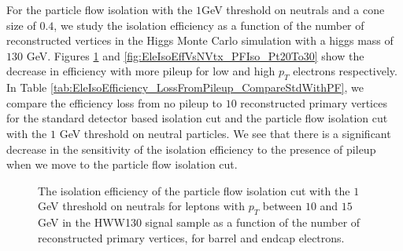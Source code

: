 For the particle flow isolation with the $1$GeV threshold on neutrals and a cone size of $0.4$, we study the isolation
efficiency as a function of the number of reconstructed vertices in the Higgs Monte Carlo simulation with a higgs 
mass of $130$ GeV. Figures \ref{fig:EleIsoEffVsNVtx_PFIso_Pt10To15} and \ref{fig:EleIsoEffVsNVtx_PFIso_Pt20To30}
show the decrease in efficiency with more pileup for low and high $p_{T}$ electrons respectively. In Table 
\ref{tab:EleIsoEfficiency_LossFromPileup_CompareStdWithPF}, we compare the efficiency loss from no pileup 
to $10$ reconstructed primary vertices for the standard detector based isolation cut and the particle flow
isolation cut with the $1$ GeV threshold on neutral particles. We see that there is a significant decrease
in the sensitivity of the isolation efficiency to the presence of pileup when we move to the particle 
flow isolation cut.


\begin{figure}[!htbp]
\begin{center}
\caption{The isolation efficiency of the particle flow isolation cut with the $1$GeV threshold on neutrals
for leptons with $p_{T}$ between $10$ and $15$ GeV in the HWW130 signal sample as a function of the 
number of reconstructed primary vertices, for barrel and endcap electrons.  }
\label{fig:EleIsoEffVsNVtx_PFIso_Pt10To15}
\end{center}
\end{figure}

